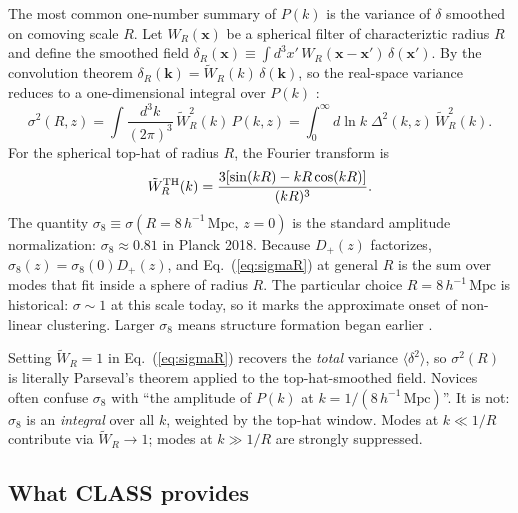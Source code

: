 \documentclass[12pt]{article}
\newcommand{\bx}{\mathbf{x}}
\newcommand{\bk}{\mathbf{k}}
\newcommand{\Dp}{D_+}
\begin{document}
The most common one-number summary of $P(k)$ is the variance of
$\delta$ smoothed on comoving scale $R$.  Let $W_R(\bx)$ be a
spherical filter of characteriztic radius $R$ and define the
smoothed field
$\delta_R(\bx)\equiv\int d^3x'\,W_R(\bx-\bx')\,\delta(\bx')$.
By the convolution theorem $\delta_R(\bk)=\tilde W_R(k)\,\delta(\bk)$,
so the real-space variance reduces to a one-dimensional integral over
$P(k)$ \citep[][eq.~2.21]{Jeong2010}:
%
\begin{equation}
  \sigma^2(R,z) = \int\!\frac{d^3k}{(2\pi)^3}\,\tilde W_R^2(k)\,P(k,z)
  = \int_0^\infty\!d\ln k\;\Delta^2(k,z)\,\tilde W_R^2(k).
  \label{eq:sigmaR}
\end{equation}
%
For the spherical top-hat of radius $R$, the Fourier transform is
%
\begin{equation}
  \tilde W_R^{\rm TH}(k)
    = \frac{3[\sin(kR)-kR\cos(kR)]}{(kR)^3}.
  \label{eq:wtop}
\end{equation}
%
The quantity
$\sigma_8\equiv\sigma(R=8\,h^{-1}\,\mathrm{Mpc},\,z=0)$ is the
standard amplitude normalization: $\sigma_8\approx 0.81$ in Planck
2018.  Because $\Dp(z)$ factorizes, $\sigma_8(z)=\sigma_8(0)\Dp(z)$,
and Eq.~(\ref{eq:sigmaR}) at general $R$ is the sum over modes
that fit inside a sphere of radius $R$.  The particular choice
$R=8\,h^{-1}\,\mathrm{Mpc}$ is historical: $\sigma\sim1$ at this
scale today, so it marks the approximate onset of non-linear
clustering.  Larger $\sigma_8$ means structure formation began
earlier \citep[][\S3.2.5]{Tong2019}.

\begin{tcolorbox}[colback=gray!5, colframe=gray!55!black,
                  title={\bfseries Parseval and $\sigma_8$ in one line},
                  coltitle=white, fonttitle=\bfseries,
                  before skip=1em, after skip=1em]
Setting $\tilde W_R=1$ in Eq.~(\ref{eq:sigmaR}) recovers the
\emph{total} variance $\langle\delta^2\rangle$, so $\sigma^2(R)$ is
literally Parseval's theorem applied to the top-hat-smoothed field.
Novices often confuse $\sigma_8$ with ``the amplitude of $P(k)$ at
$k=1/(8\,h^{-1}\,\mathrm{Mpc})$''.  It is not: $\sigma_8$ is an
\emph{integral} over all $k$, weighted by the top-hat window.
Modes at $k\ll 1/R$ contribute via $\tilde W_R\to 1$; modes at
$k\gg 1/R$ are strongly suppressed.
\end{tcolorbox}

\subsection{What CLASS provides}
\label{sec:class_output}
\end{document}
